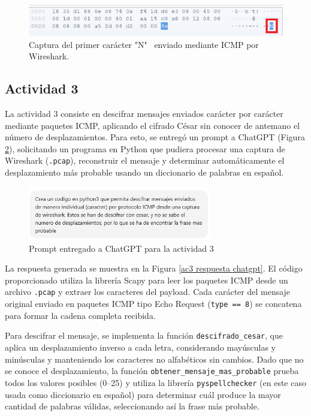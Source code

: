 \documentclass[letter,12pt]{article}
\begin{document}
\begin{figure}[H]
        \centering
        \includegraphics[width=\linewidth]{actividades/ac2/caracter_0.png}
        \caption{Captura del primer carácter "N" \ enviado mediante ICMP por Wireshark.}
        \label{ac2 caracter 0}
\end{figure}

\subsection{Actividad 3}
\label{actividad 3 respuesta}
La actividad 3 consiste en descifrar mensajes enviados carácter por carácter mediante paquetes ICMP, aplicando el cifrado César sin conocer de antemano el número de desplazamientos. Para esto, se entregó un prompt a ChatGPT (Figura \ref{ac3 prompt chatgpt}), solicitando un programa en Python que pudiera procesar una captura de Wireshark (\verb|.pcap|), reconstruir el mensaje y determinar automáticamente el desplazamiento más probable usando un diccionario de palabras en español.

\begin{figure}[H]
        \centering
        \includegraphics[width=8cm]{actividades/ac3/chatgpt_prompt.png}
        \caption{Prompt entregado a ChatGPT para la actividad 3}
        \label{ac3 prompt chatgpt}
\end{figure}

La respuesta generada se muestra en la Figura \ref{ac3 respuesta chatgpt}. El código proporcionado utiliza la librería Scapy para leer los paquetes ICMP desde un archivo \verb|.pcap| y extraer los caracteres del payload. Cada carácter del mensaje original enviado en paquetes ICMP tipo Echo Request (\verb|type == 8|) se concatena para formar la cadena completa recibida.

Para descifrar el mensaje, se implementa la función \verb|descifrado_cesar|, que aplica un desplazamiento inverso a cada letra, considerando mayúsculas y minúsculas y manteniendo los caracteres no alfabéticos sin cambios. Dado que no se conoce el desplazamiento, la función \verb|obtener_mensaje_mas_probable| prueba todos los valores posibles (0–25) y utiliza la librería \verb|pyspellchecker| (en este caso usada como diccionario en español) para determinar cuál produce la mayor cantidad de palabras válidas, seleccionando así la frase más probable.
\end{document}
